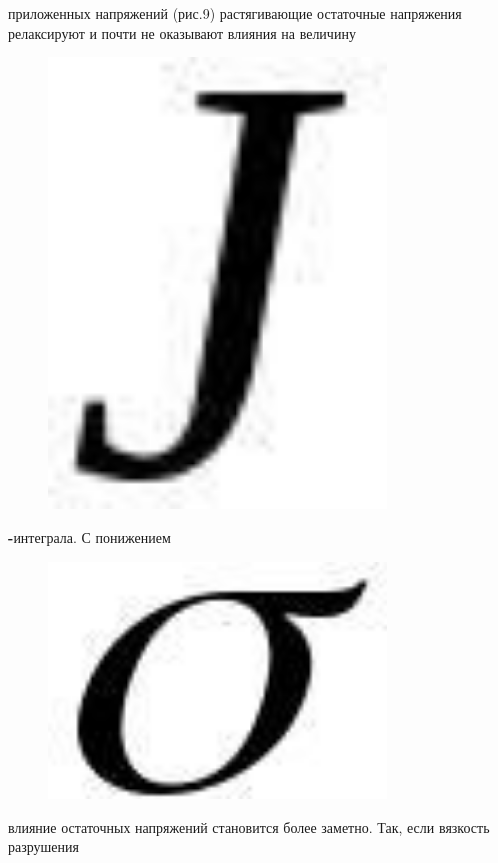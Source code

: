 приложенных напряжений (рис.9) растягивающие остаточные напряжения
релаксируют и почти не оказывают влияния на величину
\begin{figure}[H]
	\centering
	\includegraphics[width=0.8\textwidth]{assets/1233}
	\caption*{}
\end{figure}{\bfseries -}интеграла. С понижением
\begin{figure}[H]
	\centering
	\includegraphics[width=0.8\textwidth]{assets/1234}
	\caption*{}
\end{figure} влияние остаточных напряжений
становится более заметно. Так, если вязкость разрушения
